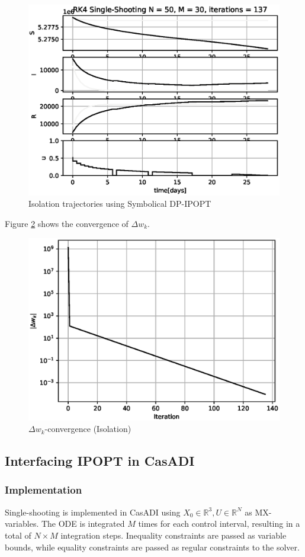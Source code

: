\begin{figure}[H]
    \centering
    \includegraphics[width=.8\textwidth]{pythonProject/Figures/Symbolic_IPOPT_Traj_Isolation.eps}
    \caption{Isolation trajectories using Symbolical DP-IPOPT}
    \label{fig:Symbolical_DPIPOPT_traj_Vaccine_Isolation}
\end{figure}
Figure \ref{fig:Delta_wk_convergence_Isolation} shows the convergence of $\Delta w_k$.

\begin{figure}[H]
    \centering
    \includegraphics[width=.8\textwidth]{pythonProject/Figures/Symbolic_IPOPT_error_Isolation.eps}
    \caption{$\Delta w_k$-convergence (Isolation)}
    \label{fig:Delta_wk_convergence_Isolation}
\end{figure}


\subsection{Interfacing IPOPT in CasADI}
\subsubsection{Implementation}
Single-shooting is implemented in CasADI using $X_0 \in \mathbb{R}^3, U \in \mathbb{R}^{N}$ as MX-variables. The ODE is integrated $M$ times for each control interval, resulting in a total of $N\times M$ integration steps. Inequality constraints are passed as variable bounds, while equality constraints are passed as regular constraints to the solver.

